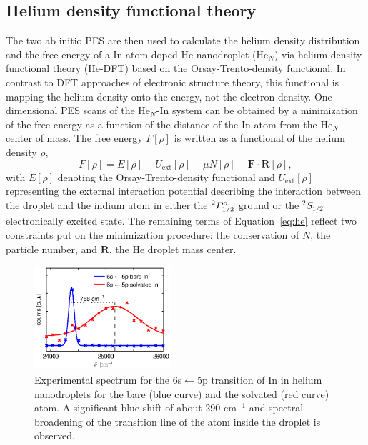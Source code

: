 \documentclass[twoside,twocolumn,9pt]{article}
\begin{document}
\subsection{Helium density functional theory}
The two ab initio PES are then used to calculate the helium density distribution and the free energy of a In-atom-doped He nanodroplet (He$_N$) via helium density functional theory (He-DFT) based on the Orsay-Trento-density functional.\cite{Dalfovo:1995gf} In contrast to DFT approaches of electronic structure theory, this functional is mapping the helium density onto the energy, not the electron density. One-dimensional PES scans of the He$_{N}$-In system can be obtained by a minimization of the free energy as a function of the distance of the In atom from the He$_{N}$ center of mass. The free energy $F[\rho]$ is written as a functional of the helium density $\rho$,
\begin{equation}
  \label{eq:he}
  F[\rho{}] = E[\rho] + U_{\mathrm{ext}}[\rho] - \mu{}N[\rho] - \mathbf{F}\cdot{}\mathbf{R}
[\rho], 
\end{equation}
with $E[\rho]$ denoting the Orsay-Trento-density functional and $U_{\mathrm{ext}}[\rho]$  representing the external interaction potential describing the interaction between the droplet and the indium atom in either the $^2P^{\rm o}_{1/2}$ ground or the $^2S_{1/2}$ electronically excited state. The remaining terms of Equation~\ref{eq:he} reflect two constraints put on the minimization procedure: the conservation of $N$, the particle number, and $\mathbf{R}$, the He droplet mass center.


\begin{figure}[htbp!]
  	\begin{center}
 		\includegraphics[width=0.45\textwidth]{2.eps}
                \caption{Experimental spectrum for the 6s$\leftarrow{}$5p  transition of In in helium nanodroplets for the bare (blue curve) and the solvated (red curve) atom. A significant blue shift of about 290 cm$^{-1}$ and spectral broadening of the transition line of the atom inside the droplet is observed. \label{pic:exp}}
  	\end{center}
\end{figure}
\end{document}
